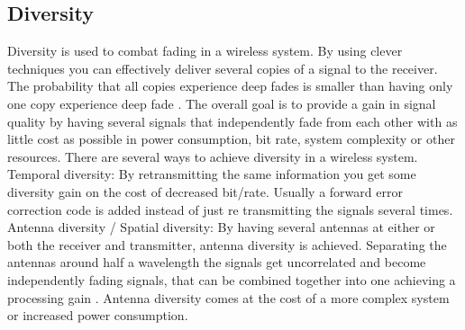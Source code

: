 %
%
%
%

\subsection{Diversity}
Diversity is used to combat fading in a wireless system. By using clever techniques you can effectively deliver several copies of a signal to the receiver. The probability that all copies experience deep fades is smaller than having only one copy experience deep fade \citep[p. 4-6]{diversityFuture}. The overall goal is to provide a gain in signal quality by having several signals that independently fade from each other with as little cost as possible in power consumption, bit rate, system complexity or other resources. There are several ways to achieve diversity in a wireless system. \\
Temporal diversity: By retransmitting the same information you get some diversity gain on the cost of decreased bit/rate. Usually a forward error correction code is added instead of just re transmitting the signals several times. \\
Antenna diversity / Spatial diversity:
By having several antennas at either or both the receiver and transmitter, antenna diversity is achieved. Separating the antennas around half a wavelength the signals get uncorrelated and become independently fading signals, that can be combined together into one achieving a processing gain \citep{diversityAntenna}. Antenna diversity comes at the cost of a more complex system or increased power consumption.


